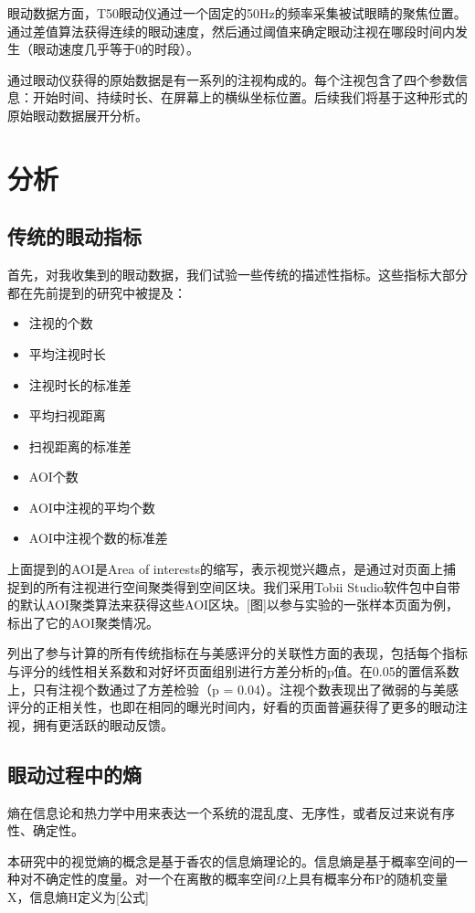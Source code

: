 眼动数据方面，T50眼动仪通过一个固定的50Hz的频率采集被试眼睛的聚焦位置。通过差值算法获得连续的眼动速度，然后通过阈值来确定眼动注视在哪段时间内发生（眼动速度几乎等于0的时段）。

通过眼动仪获得的原始数据是有一系列的注视构成的。每个注视包含了四个参数信息：开始时间、持续时长、在屏幕上的横纵坐标位置。后续我们将基于这种形式的原始眼动数据展开分析。

\section{分析}
\subsection{传统的眼动指标}
首先，对我收集到的眼动数据，我们试验一些传统的描述性指标。这些指标大部分都在先前提到的研究中被提及：

\begin{itemize}
  \item 注视的个数
  \item 平均注视时长
  \item 注视时长的标准差
  \item 平均扫视距离
  \item 扫视距离的标准差
  \item AOI个数
  \item AOI中注视的平均个数
  \item AOI中注视个数的标准差
\end{itemize}

上面提到的AOI是Area of interests的缩写，表示视觉兴趣点，是通过对页面上捕捉到的所有注视进行空间聚类得到空间区块。我们采用Tobii Studio软件包中自带的默认AOI聚类算法来获得这些AOI区块。[图]以参与实验的一张样本页面为例，标出了它的AOI聚类情况。

列出了参与计算的所有传统指标在与美感评分的关联性方面的表现，包括每个指标与评分的线性相关系数和对好坏页面组别进行方差分析的p值。在0.05的置信系数上，只有注视个数通过了方差检验（p = 0.04）。注视个数表现出了微弱的与美感评分的正相关性，也即在相同的曝光时间内，好看的页面普遍获得了更多的眼动注视，拥有更活跃的眼动反馈。


\subsection{眼动过程中的熵}
熵在信息论和热力学中用来表达一个系统的混乱度、无序性，或者反过来说有序性、确定性。

本研究中的视觉熵的概念是基于香农的信息熵理论的。信息熵是基于概率空间的一种对不确定性的度量。对一个在离散的概率空间$\Omega$上具有概率分布P的随机变量X，信息熵H定义为[公式]

